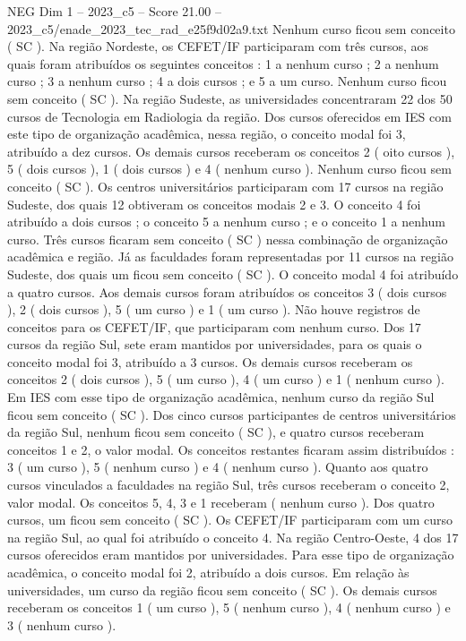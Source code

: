 \begin{textsample}{NEG Dim 1 – 2023\_c5 – Score 21.00 – 2023\_c5/enade\_2023\_tec\_rad\_e25f9d02a9.txt}
Nenhum curso ficou sem conceito ( SC ).
Na região Nordeste, os CEFET/IF participaram com três cursos, aos quais foram atribuídos os seguintes conceitos : 1 a nenhum curso ; 2 a nenhum curso ; 3 a nenhum curso ; 4 a dois cursos ; e 5 a um curso.
Nenhum curso ficou sem conceito ( SC ).
Na região Sudeste, as universidades concentraram 22 dos 50 cursos de Tecnologia em Radiologia da região.
Dos cursos oferecidos em IES com este tipo de organização acadêmica, nessa região, o conceito modal foi 3, atribuído a dez cursos.
Os demais cursos receberam os conceitos 2 ( oito cursos ), 5 ( dois cursos ), 1 ( dois cursos ) e 4 ( nenhum curso ).
Nenhum curso ficou sem conceito ( SC ).
Os centros universitários participaram com 17 cursos na região Sudeste, dos quais 12 obtiveram os conceitos modais 2 e 3.
O conceito 4 foi atribuído a dois cursos ; o conceito 5 a nenhum curso ; e o conceito 1 a nenhum curso.
Três cursos ficaram sem conceito ( SC ) nessa combinação de organização acadêmica e região.
Já as faculdades foram representadas por 11 cursos na região Sudeste, dos quais um ficou sem conceito ( SC ).
O conceito modal 4 foi atribuído a quatro cursos.
Aos demais cursos foram atribuídos os conceitos 3 ( dois cursos ), 2 ( dois cursos ), 5 ( um curso ) e 1 ( um curso ).
Não houve registros de conceitos para os CEFET/IF, que participaram com nenhum curso.
Dos 17 cursos da região Sul, sete eram mantidos por universidades, para os quais o conceito modal foi 3, atribuído a 3 cursos.
Os demais cursos receberam os conceitos 2 ( dois cursos ), 5 ( um curso ), 4 ( um curso ) e 1 ( nenhum curso ).
Em IES com esse tipo de organização acadêmica, nenhum curso da região Sul ficou sem conceito ( SC ).
Dos cinco cursos participantes de centros universitários da região Sul, nenhum ficou sem conceito ( SC ), e quatro cursos receberam conceitos 1 e 2, o valor modal.
Os conceitos restantes ficaram assim distribuídos : 3 ( um curso ), 5 ( nenhum curso ) e 4 ( nenhum curso ).
Quanto aos quatro cursos vinculados a faculdades na região Sul, três cursos receberam o conceito 2, valor modal.
Os conceitos 5, 4, 3 e 1 receberam ( nenhum curso ).
Dos quatro cursos, um ficou sem conceito ( SC ).
Os CEFET/IF participaram com um curso na região Sul, ao qual foi atribuído o conceito 4.
Na região Centro-Oeste, 4 dos 17 cursos oferecidos eram mantidos por universidades.
Para esse tipo de organização acadêmica, o conceito modal foi 2, atribuído a dois cursos.
Em relação às universidades, um curso da região ficou sem conceito ( SC ).
Os demais cursos receberam os conceitos 1 ( um curso ), 5 ( nenhum curso ), 4 ( nenhum curso ) e 3 ( nenhum curso ).

\end{textsample}
